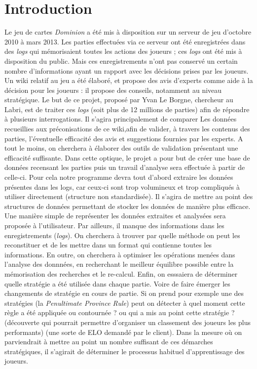 \documentclass{scrreprt}
\begin{document}
\section{Introduction}
Le jeu de cartes \textit{Dominion} a été mis à disposition sur un serveur de jeu d'octobre 2010 à mars 2013. Les parties effectuées via ce serveur ont été enregistrées dans des \textit{logs} qui mémorisaient toutes les actions des joueurs ; ces \textit{logs} ont été mis à disposition du public. Mais ces enregistrements n'ont pas conservé un certain nombre d'informations ayant un rapport avec les décisions prises par les joueurs.
\newline Un wiki relatif au jeu a été élaboré, et propose des avis d'experts comme aide à la décision pour les joueurs : il propose des conseils, notamment au niveau stratégique. Le but de ce projet, proposé par Yvan Le Borgne, chercheur au Labri, est de traiter ces \textit{logs} (soit plus de 12 millions de parties) afin de répondre à plusieurs interrogations. Il s'agira principalement de comparer Les données recueillies aux préconisations de ce wiki,afin de valider, à travers les contenus des parties, l'éventuelle efficacité des avis et suggestions fournies par les experts. A tout le moins, on cherchera à élaborer des outils de validation présentant une efficacité suffisante.
\newline Dans cette optique, le projet a pour but de créer une base de données recensant les parties puis un travail d'analyse sera effectuée à partir de celle-ci.
Pour cela notre programme devra tout d'abord extraire les données présentes dans les logs, car ceux-ci sont trop volumineux et trop compliqués à utiliser directement (structure non standardisée). Il s'agira de mettre au point des structures de données permettant de stocker les données de manière plus efficace. Une manière simple de représenter les données extraites et analysées sera proposée à l'utilisateur.
Par ailleurs, il manque des informations dans les enregistrements (\textit{logs}). On cherchera à trouver par quelle méthode on peut les reconstituer et de les mettre dans un format qui contienne toutes les informations.
En outre, on cherchera à optimiser les opérations menées dans l'analyse des donnnées, en recherchant le meilleur équilibre possible entre la mémorisation des recherches et le re-calcul.
Enfin, on esssaiera de déterminer quelle stratégie a été utilisée dans chaque partie. Voire de faire émerger les changements de stratégie en cours de partie. Si on prend pour exemple une des stratégies (la \textit{Penultimate Province Rule}) peut on détecter à quel moment cette règle a été appliquée ou contournée ? ou qui a mis au point cette stratégie ? (découverte qui pourrait permettre d'organiser un classement des joueurs les plus performants) (une sorte de ELO demandé par le client). Dans la mesure où on parviendrait à mettre au point un nombre suffisant de ces démarches stratégiques, il s'agirait de déterminer le processus habituel d'apprentissage des joueurs.
\end{document}
